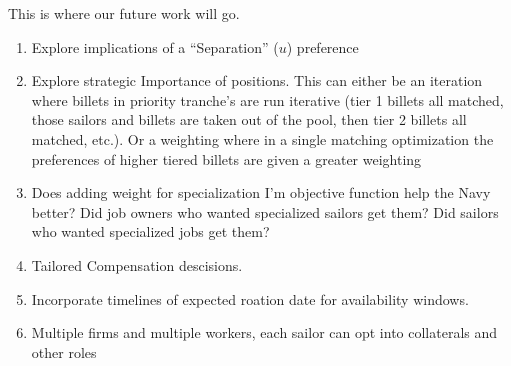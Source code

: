 This is where our future work will go.

\begin{enumerate}

\item Explore implications of a ``Separation'' ($u$) preference

\item Explore strategic Importance of positions. This can either be an iteration where billets in priority tranche's are run iterative (tier 1 billets all matched, those sailors and billets are taken out of the pool, then tier 2 billets all matched, etc.). Or a weighting where in a single matching optimization the preferences of higher tiered billets are given a greater weighting

\item Does adding weight for specialization I’m objective function help the Navy better? Did job owners who wanted specialized sailors get them? Did sailors who wanted specialized jobs get them?

\item Tailored Compensation descisions. 

\item Incorporate timelines of expected roation date for availability windows.

\item Multiple firms and multiple workers, each sailor can opt into collaterals and other roles \cite{1982_Roth}

\end{enumerate}